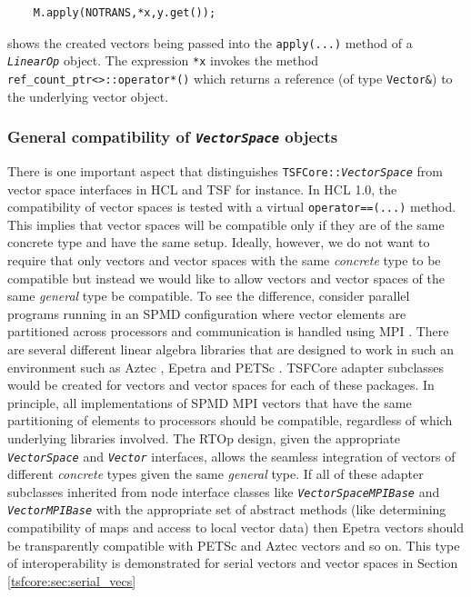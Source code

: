 \documentclass[10pt,fleqn]{article}
\begin{document}
{\scriptsize\begin{verbatim}
    M.apply(NOTRANS,*x,y.get());
\end{verbatim}}

shows the created vectors being passed into the \texttt{apply(...)}
method of a \texttt{\textit{LinearOp}} object.  The expression
\texttt{*x} invokes the method
\texttt{ref\_count\_ptr<>\-::operator*()} which returns a reference
(of type \texttt{Vector\&}) to the underlying vector object.

%
\subsubsection{General compatibility of \texttt{\textit{VectorSpace}} objects}
\label{tsfcore:sec:vec_spc_compatibility}
%

There is one important aspect that distinguishes
\texttt{TSFCore\-::\textit{VectorSpace}} from vector space interfaces in
HCL and TSF for instance.  In HCL 1.0, the compatibility of vector
spaces is tested with a virtual \texttt{operator==(...)}  method.
This implies that vector spaces will be compatible only if they are of
the same concrete type and have the same setup.  Ideally, however, we
do not want to require that only vectors and vector spaces with the
same {\em concrete} type to be compatible but instead we would like to
allow vectors and vector spaces of the same {\em general} type be
compatible.  To see the difference, consider parallel programs running
in an SPMD configuration where vector elements are partitioned across
processors and communication is handled using MPI
\cite{ref:mpi}.  There are several different linear algebra libraries
that are designed to work in such an environment such as Aztec
\cite{sd:aztec}, Epetra \cite{ref:Epetra} and PETSc \cite{ref:petsc}.  TSFCore
adapter subclasses would be created for vectors and vector spaces for
each of these packages.  In principle, all implementations of SPMD MPI
vectors that have the same partitioning of elements to processors
should be compatible, regardless of which underlying libraries
involved.  The RTOp design, given the appropriate
\texttt{\textit{VectorSpace}} and \texttt{\textit{Vector}} interfaces,
allows the seamless integration of vectors of different {\em concrete}
types given the same {\em general} type.  If all of these adapter
subclasses inherited from node interface classes like
\texttt{\textit{VectorSpaceMPIBase}} and
\texttt{\textit{VectorMPIBase}} with the appropriate set of abstract
methods (like determining compatibility of maps and access to local
vector data) then Epetra vectors should be transparently compatible
with PETSc and Aztec vectors and so on.  This type of interoperability
is demonstrated for serial vectors and vector spaces in Section
\ref{tsfcore:sec:serial_vecs}
\end{document}
